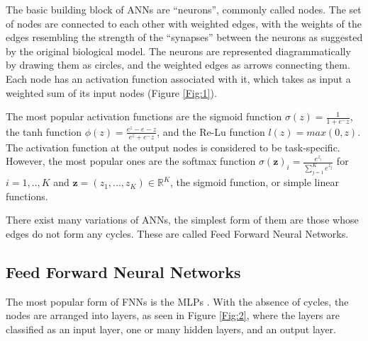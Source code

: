 The basic building block of \ac{ANN}s are \enquote{neurons}, commonly called nodes. The set of nodes are connected to each other with weighted edges, with the weights of the edges resembling the strength of the \enquote{synapses} between the neurons as suggested by the original biological model. 
The neurons are represented diagrammatically by drawing them as circles, and the weighted edges as arrows connecting them. Each node has an activation function associated with it, which takes as input a weighted sum of its input nodes (Figure \ref{Fig:1}). 



The most popular activation functions are the sigmoid function $  \sigma(z) =  \frac{\mathrm{1} }{\mathrm{1} + e^-z }  $, the tanh function $  \phi(z) =  \frac{ e^z - e-z }{e^z + e^-z }  $, and the Re-Lu function $ l(z) = max(0,z) $. The activation function at the output nodes is considered to be task-specific. However, the most popular ones are the softmax function $ \sigma(\mathbf{z})_i = \frac{ e^ {z_i} }{ \sum_{j=1}^{K} e^{z_j} }$ for $i=1,..,K$ and $\mathbf{z}=(z_1,...,z_K) \in \mathds{R}^K $, the sigmoid function, or simple linear functions.


There exist many variations of \ac{ANN}s, the simplest form of them are those whose edges do not form any cycles. These are called Feed Forward Neural Networks.


\subsection{Feed Forward Neural Networks}
\label{bg:s2_sub1}

The most popular form of \ac{FNN}s is the \ac{MLP}s \cite{rumelhart1985learning} \cite{werbos1988generalization} \cite{bishop1995neural}.
With the absence of cycles, the nodes are arranged into layers, as seen in Figure \ref{Fig:2}, where the layers are classified as an input layer, one or many hidden layers, and an output layer. 



